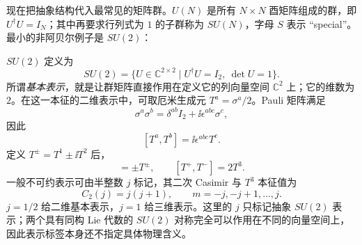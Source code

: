 现在把抽象结构代入最常见的矩阵群。$U(N)$ 是所有 $N\times N$ 酉矩阵组成的群，即 $U^\dagger U=I_N$；其中再要求行列式为 $1$ 的子群称为 $SU(N)$，字母 $S$ 表示 ``special''。最小的非阿贝尔例子是 $SU(2)$：

$SU(2)$ 定义为
\begin{equation*}
 SU(2)=\{U\in\mathbb C^{2\times2}\mid U^\dagger U=I_2,\ \det U=1\}.
\end{equation*}
所谓\emph{基本表示}，就是让群矩阵直接作用在定义它的列向量空间 $\mathbb C^2$ 上；它的维数为 $2$。在这一本征的二维表示中，可取厄米生成元 $T^a=\sigma^a/2$。Pauli 矩阵满足
\begin{equation}
 \sigma^a\sigma^b
 =\delta^{ab}I_2+\ii\epsilon^{abc}\sigma^c,
 \label{eq:pauli-product-lie-dp68}
\end{equation}
因此
\begin{equation}
 \boxed{[T^a,T^b]=\ii\epsilon^{abc}T^c.}
 \label{eq:su2-algebra-dp11}
\end{equation}
定义 $T^\pm=T^1\pm\ii T^2$ 后，
\begin{equation}
 [T^3,T^\pm]=\pm T^\pm,
 \qquad [T^+,T^-]=2T^3.
 \label{eq:su2-ladder-algebra-dp11}
\end{equation}
一般不可约表示可由半整数 $j$ 标记，其二次 Casimir 与 $T^3$ 本征值为
\begin{equation}
 \boxed{
 C_2(j)=j(j+1),
 \qquad m=-j,-j+1,\ldots,j.}
 \label{eq:su2-casimir-dp11}
\end{equation}
$j=1/2$ 给二维基本表示，$j=1$ 给三维表示。这里的 $j$ 只标记抽象 $SU(2)$ 表示；两个具有同构 Lie 代数的 $SU(2)$ 对称完全可以作用在不同的向量空间上，因此表示标签本身还不指定具体物理含义。

